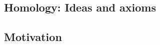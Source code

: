 \documentclass[11pt]{book}
\numberwithin{dummy}{section}
\theoremstyle{nonumberbreak}
\newenvironment{ex}[1][]{\ifthenelse{\equal{#1}{}}{\example}{\example[#1]}\rm}{\endexample}
\begin{document}
\begin{spacing}{1.4}
\begin{ex}
\end{ex}







\newpage
\thispagestyle{empty}























\chapter{Homology: Ideas and axioms} %
\setlength\abovedisplayshortskip{0pt}
\setlength\belowdisplayshortskip{10pt}
\setlength\abovedisplayskip{10pt}
\setlength\belowdisplayskip{10pt}



\section{Motivation} %

\thispagestyle{empty}



\end{spacing}
\end{document}
